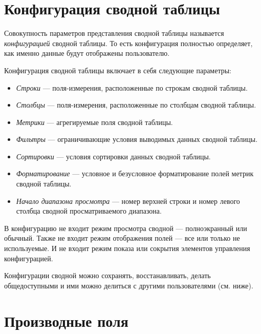 \documentclass[../user-manual.tex]{subfiles}
\begin{document}
	\section{Конфигурация сводной таблицы}
	
	Совокупность параметров представления сводной таблицы называется \textit{конфигурацией} сводной таблицы. То есть конфигурация полностью определяет, как именно данные будут отображены пользователю.
	
	Конфигурация сводной таблицы включает в себя следующие параметры:
	
	\begin{itemize}
				\item \textit{Строки} --- поля-измерения, расположенные по строкам сводной таблицы.
				
				\item \textit{Столбцы} --- поля-измерения, расположенные по столбцам сводной таблицы.
						
				\item \textit{Метрики} --- агрегируемые поля сводной таблицы.
			
				\item \textit{Фильтры} --- ограничивающие условия выводимых данных сводной таблицы.
			
				\item \textit{Сортировки} --- условия сортировки данных сводной таблицы.
			
				\item \textit{Форматирование} --- условное и безусловное форматирование полей метрик сводной таблицы.
				
				\item \textit{Начало диапазона просмотра} --- номер верхней строки и номер левого столбца сводной просматриваемого диапазона.
	\end{itemize}
	
	В конфигурацию не входит режим просмотра сводной --- полноэкранный или обычный. Также не входит режим отображения полей --- все или только не используемые. И не входит режим показа или сокрытия элементов управления конфигурацией.
	
	Конфигурации сводной можно сохранять, восстанавливать, делать общедоступными и ими можно делиться с другими пользователями (см. ниже).

	\section{Производные поля}
	
\end{document}
